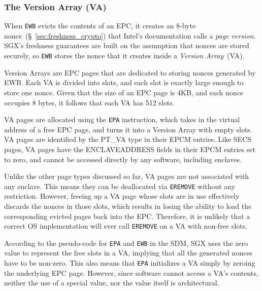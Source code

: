 \subsubsection{The Version Array (VA)}
\label{sec:sgx_va}
\label{sec:sgx_epa}


When \texttt{EWB} evicts the contents of an EPC, it creates an 8-byte
nonce~(\S~\ref{sec:freshness_crypto}) that Intel's documentation calls a
\textit{page version}. SGX's freshness guarantees are built on the assumption
that nonces are stored securely, so \texttt{EWB} stores the nonce that it
creates inside a \textit{Version Array}~(VA).

Version Arrays are EPC pages that are dedicated to storing nonces generated by
EWB. Each VA is divided into slots, and each slot is exactly large enough to
store one nonce. Given that the size of an EPC page is 4KB, and each nonce
occupies 8 bytes, it follows that each VA has 512 slots.


VA pages are allocated using the \texttt{EPA} instruction, which takes in the
virtual address of a free EPC page, and turns it into a Version Array with
empty slots. VA pages are identified by the PT\_VA type in their EPCM entries.
Like SECS pages, VA pages have the ENCLAVEADDRESS fields in their EPCM entries
set to zero, and cannot be accessed directly by any software, including
enclaves.


Unlike the other page types discussed so far, VA pages are not associated with
any enclave. This means they can be deallocated via \texttt{EREMOVE} without
any restriction. However, freeing up a VA page whose slots are in use
effectively discards the nonces in those slots, which results in losing the
ability to load the corresponding evicted pages back into the EPC. Therefore,
it is unlikely that a correct OS implementation will ever call \texttt{EREMOVE}
on a VA with non-free slots.


According to the pseudo-code for \texttt{EPA} and \texttt{EWB} in the SDM, SGX
uses the zero value to represent the free slots in a VA, implying that all the
generated nonces have to be non-zero. This also means that \texttt{EPA}
initializes a VA simply by zeroing the underlying EPC page. However, since
software cannot access a VA's contents, neither the use of a special value, nor
the value itself is architectural.


